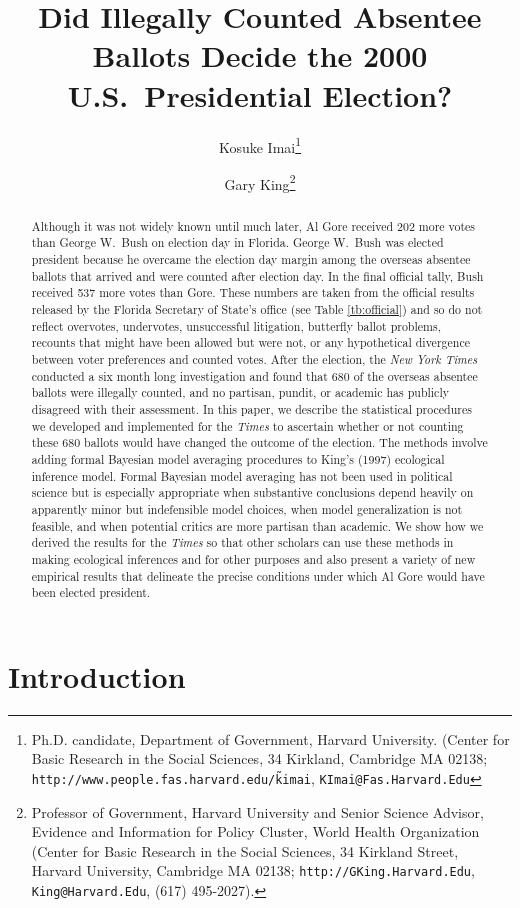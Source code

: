 \documentclass[11pt,titlepage]{article}
\title{Did Illegally Counted Absentee Ballots Decide the 2000 U.S.\ 
  Presidential Election?}
\author{Kosuke Imai\thanks{Ph.D. candidate, Department of Government,
    Harvard University. (Center for Basic Research in the Social
    Sciences, 34 Kirkland, Cambridge MA 02138;
    \texttt{http://www.people.fas.harvard.edu/\~kimai},
    \texttt{KImai@Fas.Harvard.Edu}}
\and %
Gary King\thanks{Professor of Government, Harvard University and
  Senior Science Advisor, Evidence and Information for Policy Cluster,
  World Health Organization (Center for Basic Research in the Social
  Sciences, 34 Kirkland Street, Harvard University, Cambridge MA
  02138; \texttt{http://GKing.Harvard.Edu}, \texttt{King@Harvard.Edu},
  (617) 495-2027).}  }
\begin{document}
\maketitle

\begin{abstract}
  Although it was not widely known until much later, Al Gore received
  202 more votes than George W.\ Bush on election day in Florida.
  George W.\ Bush was elected president because he overcame the
  election day margin among the overseas absentee ballots that arrived
  and were counted after election day.  In the final official tally,
  Bush received 537 more votes than Gore.  These numbers are taken
  from the official results released by the Florida Secretary of
  State's office (see Table \ref{tb:official}) and so do not reflect
  overvotes, undervotes, unsuccessful litigation, butterfly ballot
  problems, recounts that might have been allowed but were not, or any
  hypothetical divergence between voter preferences and counted votes.
  After the election, the \emph{New York Times} conducted a six month
  long investigation and found that 680 of the overseas absentee
  ballots were illegally counted, and no partisan, pundit, or academic
  has publicly disagreed with their assessment.  In this paper, we
  describe the statistical procedures we developed and implemented for
  the \emph{Times} to ascertain whether or not counting these 680
  ballots would have changed the outcome of the election.  The methods
  involve adding formal Bayesian model averaging procedures to King's
  (1997) ecological inference model.  Formal Bayesian model averaging
  has not been used in political science but is especially appropriate
  when substantive conclusions depend heavily on apparently minor but
  indefensible model choices, when model generalization is not
  feasible, and when potential critics are more partisan than
  academic.  We show how we derived the results for the \emph{Times}
  so that other scholars can use these methods in making ecological
  inferences and for other purposes and also present a variety of new
  empirical results that delineate the precise conditions under which
  Al Gore would have been elected president.
\end{abstract}


\section{Introduction}
\end{document}
